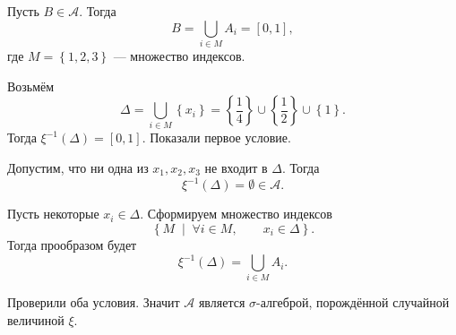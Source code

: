 \begin{enumerate}[label=\alph*)]
Пусть $B \in \mathcal{A} $.
Тогда
$$B =
\bigcup \limits_{i \in M} A_i =
\left[0, 1 \right],$$
где $M = \left\{ 1, 2, 3 \right\} $ --- множество индексов.

Возьмём
$$ \Delta =
\bigcup \limits_{i \in M} \left\{ x_i \right\} =
\left\{ \frac{1}{4} \right\} \cup \left\{ \frac{1}{2} \right\} \cup \left\{ 1 \right\}.$$
Тогда $ \xi^{-1} \left( \Delta \right) =\left[ 0, 1 \right] $.
Показали первое условие.

Допустим, что ни одна из $x_1, x_2, x_3$ не входит в $ \Delta $.
Тогда
$$ \xi^{-1} \left( \Delta \right) =
\emptyset \in
\mathcal{A}.$$

Пусть некоторые $x_i \in \Delta $.
Сформируем множество индексов
$$ \left\{ M \; \middle| \; \forall i \in M, \qquad x_i \in \Delta \right\}.$$
Тогда прообразом будет
$$ \xi^{-1} \left( \Delta \right) =
\bigcup \limits_{i \in M} A_i.$$

Проверили оба условия.
Значит $ \mathcal{A} $ является $ \sigma $-алгеброй, порождённой случайной величиной $ \xi $.
\end{enumerate}
